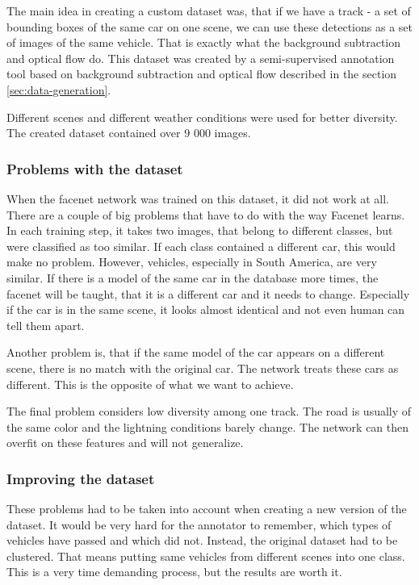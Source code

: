 \documentclass[a4paper,11pt,titlepage,twoside]{article}
\numberwithin{figure}{section}
\begin{document}
The main idea in creating a custom dataset was, that if we have a track - a set of bounding boxes of the same car on one scene, we can use these detections as a set of images of the same vehicle. That is exactly what the background subtraction and optical flow do. This dataset was created by a semi-supervised annotation tool based on background subtraction and optical flow described in the section \ref{sec:data-generation}.

Different scenes and different weather conditions were used for better diversity. The created dataset contained over 9 000 images.

\subsubsection{Problems with the dataset}
When the facenet network was trained on this dataset, it did not work at all. There are a couple of big problems that have to do with the way Facenet learns. In each training step, it takes two images, that belong to different classes, but were classified as too similar. If each class contained a different car, this would make no problem. However, vehicles, especially in South America, are very similar. If there is a model of the same car in the database more times, the facenet will be taught, that it is a different car and it needs to change. Especially if the car is in the same scene, it looks almost identical and not even human can tell them apart. 

Another problem is, that if the same model of the car appears on a different scene, there is no match with the original car. The network treats these cars as different. This is the opposite of what we want to achieve.

The final problem considers low diversity among one track. The road is usually of the same color and the lightning conditions barely change. The network can then overfit on these features and will not generalize.

\subsubsection{Improving the dataset}
These problems had to be taken into account when creating a new version of the dataset. It would be very hard for the annotator to remember, which types of vehicles have passed and which did not. Instead, the original dataset had to be clustered. That means putting same vehicles from different scenes into one class. This is a very time demanding process, but the results are worth it.
\end{document}
